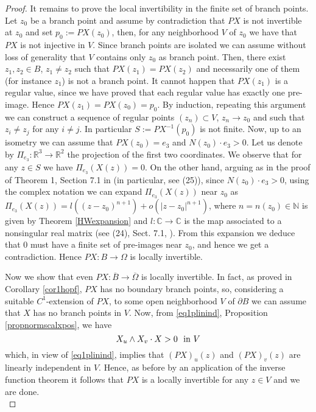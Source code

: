 \documentclass[a4paper,reqno,10pt,oneside]{amsart}
\numberwithin{equation}{section}
\begin{document}
\begin{proof}
  It remains to prove the local invertibility in the finite set of branch points. Let $z_0$ be a branch point and assume by contradiction that $PX$ is not invertible at $z_0$ and set $p_0:=PX(z_0)$, then, for any neighborhood $V$ of $z_0$ we have that $PX$ is not injective in $V$. Since branch points are isolated we can assume without loss of generality that $V$ contains only $z_0$ as branch point. Then, there exist $z_1,z_2 \in B$, $z_1\neq z_2$ such that $PX(z_1)=PX(z_2)$ and necessarily one of them (for instance $z_1$) is not a branch point. It cannot happen that $PX(z_1)$ is a regular value, since we have proved that each regular value has exactly one pre-image. Hence $PX(z_1)=PX(z_0)=p_0$. By induction, repeating this argument we can construct a sequence of regular points $(z_{n}) \subset V$, $z_n \to z_0$ and such that $z_i\neq z_j$ for any $i\neq j$. In particular $S:=PX^{-1}(p_0)$ is not finite. Now, up to an isometry we can assume that $PX(z_0)=e_3$ and ${N}(z_0) \cdot e_3>0$. Let us denote by $\Pi_{e_3}\colon{\mathbb R}^3\to {\mathbb R}^2$ the projection of the first two coordinates. We observe that for any $z \in S$ we have $\Pi_{e_3}(X(z))=0$. On the other hand, arguing as in the proof of Theorem 1, Section 7.1 in \cite{MinSurf} (in particular, see (25)), since ${N}(z_0) \cdot e_3>0$, using the complex notation we can expand $\Pi_{e_3}(X(z))$ near $z_0$ as $\Pi_{e_3}(X(z))= l((z-z_0)^{n+1})+o(|z-z_0|^{n+1})$, where $n=n(z_0) \in \mathbb{N}$ is given by Theorem \ref{HWexpansion} and $l\colon{\mathbb C} \to {\mathbb C}$ is the map associated to a nonsingular real matrix (see (24), Sect. 7.1, \cite{MinSurf}). From this expansion we deduce that $0$ must have a finite set of pre-images near $z_0$, and hence we get a contradiction. Hence $PX:B \to \Omega$ is locally invertible. 
  
  Now we show that even $PX\colon\overline B \to \overline \Omega$ is locally invertible. In fact, as proved in Corollary \ref{cor1hopf}, $PX$ has no boundary branch points, so, considering a suitable $C^1$-extension of $PX$, to some open neighborhood $V$ of $\partial B$ we can assume that $X$ has no branch points in $V$. Now, from \eqref{eq1plinind}, Proposition \ref{propnormscalxpos}, we have
$$X_u \wedge X_v \cdot X>0 \ \ \hbox{in} \ V $$
which, in view of \eqref{eq1plinind}, implies that $(PX)_u(z)$ and $(PX)_v(z)$ are linearly independent in $V$. Hence, as before by an application of the inverse function theorem it follows that $PX$ is a locally invertible for any $z \in V$ and we are done.\\


\end{proof}
\end{document}
